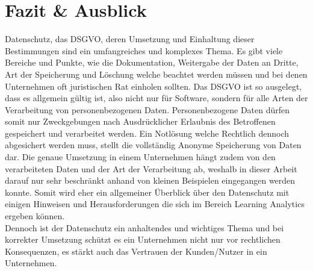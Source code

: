 \documentclass[a4paper, 12pt]{article}
\begin{document}
\newpage
\section{Fazit \& Ausblick}
Datenschutz, das DSGVO, deren Umsetzung und Einhaltung dieser Bestimmungen sind ein umfangreiches und komplexes Thema. Es gibt viele Bereiche und Punkte, wie die Dokumentation, Weitergabe der Daten an Dritte, Art der Speicherung und Löschung welche beachtet werden müssen und bei denen Unternehmen oft juristischen Rat einholen sollten. Das DSGVO ist so ausgelegt, dass es allgemein gültig ist, also nicht nur für Software, sondern für alle Arten der Verarbeitung von personenbezogenen Daten. Personenbezogene Daten dürfen somit nur Zweckgebungen nach Ausdrücklicher Erlaubnis des Betroffenen gespeichert und verarbeitet werden. Ein Notlösung welche Rechtlich dennoch abgesichert werden muss, stellt die vollständig Anonyme Speicherung von Daten dar. Die genaue Umsetzung in einem Unternehmen hängt zudem von den verarbeiteten Daten und der Art der Verarbeitung ab, weshalb in dieser Arbeit darauf nur sehr beschränkt anhand von kleinen Beispielen eingegangen werden konnte. Somit wird eher ein allgemeiner Überblick über den Datenschutz mit einigen Hinweisen und Herausforderungen die sich im Bereich Learning Analytics ergeben können.\\Dennoch ist der Datenschutz ein anhaltendes und wichtiges Thema und bei korrekter Umsetzung schützt es ein Unternehmen nicht nur vor rechtlichen Konsequenzen, es stärkt auch das Vertrauen der Kunden/Nutzer in ein Unternehmen.
\newpage
\listoffigures
\newpage

\newpage

\end{document}
